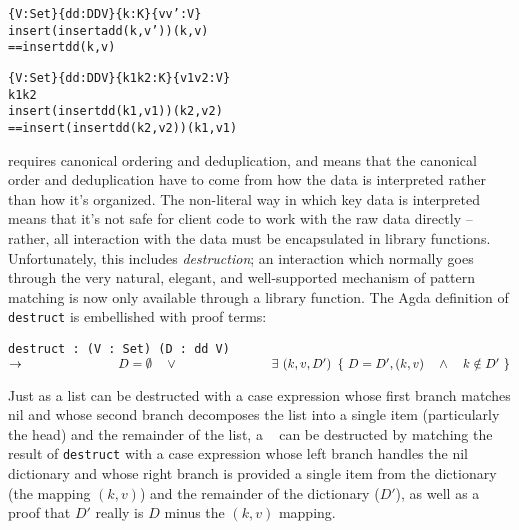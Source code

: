 

\begin{theorem}
\label{thm:cont-dicts}
\justIndent
\begin{alltt}
\{V : Set\} \{dd : DD V\} \{k : K\} \{v v' : V\} \altRArr
  insert (insert add (k, v')) (k, v)
     == insert dd (k, v)
\end{alltt}
\end{theorem}

\begin{theorem}
\label{thm:exch-dicts}
\justIndent
\begin{alltt}
\{V : Set\} \{dd : DD V\} \{k1 k2 : K\} \{v1 v2 : V\} \altRArr
  k1 \altNE k2 \altRArr
  insert (insert dd (k1, v1)) (k2, v2)
    == insert (insert dd (k2, v2)) (k1, v1)
\end{alltt}
\end{theorem}


\SemInj{} requires canonical ordering and deduplication, and \SemTot{} means that the canonical order and deduplication have to come from
how the data is interpreted rather than how it's organized. The non-literal way in which key data is interpreted means that it's not
safe for client code to work with the raw data directly -- rather, all interaction with the data must be
encapsulated in library functions. Unfortunately, this includes \emph{destruction}; an interaction which
normally goes through the very natural, elegant, and well-supported mechanism of pattern matching is now
only available through a library function. The Agda definition of \verb+destruct+ is embellished with proof terms:

\texttt{destruct : (V : Set) (D : dd V) $\rightarrow \\
\phantom{xxxxxxxxxxxxx} D = \emptyset \quad \lor \\
\phantom{xxxxxxxxxxxxx} \exists~(k, v, D')~\left\{~ D = D' , (k, v) \quad \land \quad k \notin D' ~\right\}$}

Just as a list can be destructed with a case expression whose first branch matches nil and whose second branch
decomposes the list into a single item (particularly the head) and the remainder of the list, a \dd~ can be
destructed by matching the result of \verb+destruct+ with a case expression whose left branch handles the
nil dictionary and whose right branch is provided a single item from the dictionary (the mapping $(k, v)$)
and the remainder of the dictionary ($D'$), as well as a proof that $D'$ really is $D$ minus the $(k, v)$
mapping.

